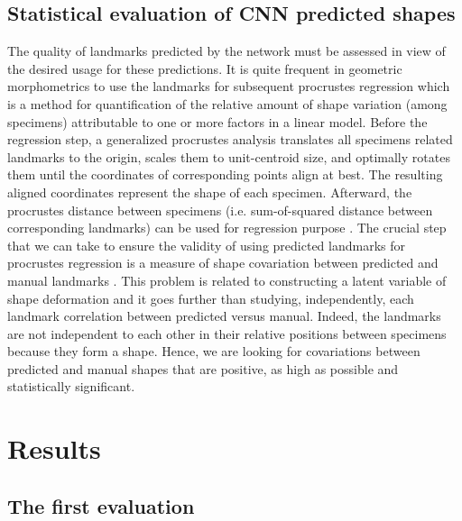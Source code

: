 \documentclass[review]{elsarticle}
\begin{document}
\subsection{Statistical evaluation of CNN predicted shapes}
\label{subsec24}
The quality of landmarks predicted by the network must be assessed in view of the desired usage for these predictions. It is quite frequent in geometric morphometrics to use the landmarks for subsequent procrustes regression \cite{adams_geomorph_2013} which is a method for  quantification of the relative amount of shape variation (among specimens) attributable to one or more factors in a linear model. 
Before the regression step, a generalized procrustes analysis \cite{adams_geomorph_2013} translates all specimens related landmarks to the origin, scales them to unit-centroid size, and optimally rotates them until the coordinates of corresponding points align at best. The resulting aligned coordinates represent the shape of each specimen. Afterward, the procrustes distance between specimens (i.e. sum-of-squared distance between corresponding landmarks) can be used for regression purpose \cite{goodall_procrustes_1991}. 
The crucial step that we can take to ensure the validity of using predicted landmarks for procrustes regression is a measure of shape covariation between predicted and manual landmarks \cite{rohlf_use_2000}. 
This problem is related to constructing a latent variable of shape deformation and it goes further than studying, independently, each landmark correlation between predicted versus manual. Indeed, the landmarks are not independent to each other in their relative positions between specimens because they form a shape. Hence, we are looking for covariations between predicted and manual shapes that are positive, as high as possible  and statistically significant. 

\section{Results}
\label{sec3}
\subsection{The first evaluation}
\label{subsec31}
\end{document}
